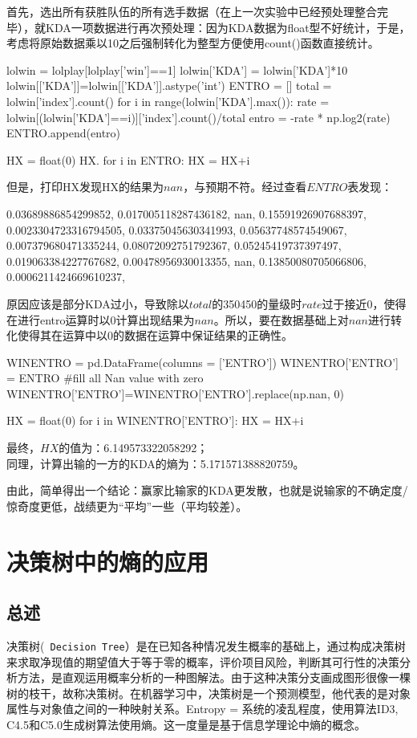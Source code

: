 \documentclass[lang=cn,11pt]{elegantpaper}
\begin{document}
首先，选出所有获胜队伍的所有选手数据（在上一次实验中已经预处理整合完毕），就KDA一项数据进行再次预处理：因为KDA数据为float型不好统计，于是，考虑将原始数据乘以10之后强制转化为整型方便使用count()函数直接统计。
\begin{python}
lolwin = lolplay[lolplay['win']==1]
lolwin['KDA'] = lolwin['KDA']*10
lolwin[['KDA']]=lolwin[['KDA']].astype('int')
ENTRO = []
total = lolwin['index'].count()
for i in range(lolwin['KDA'].max()):
    rate = lolwin[(lolwin['KDA']==i)]['index'].count()/total
    entro = -rate * np.log2(rate)
    ENTRO.append(entro)

HX = float(0)
HX.
for i in ENTRO:
    HX = HX+i
\end{python}

但是，打印HX发现HX的结果为$nan$，与预期不符。经过查看$ENTRO$表发现：
\begin{python}
 0.03689886854299852,
 0.017005118287436182,
 nan,
 0.15591926907688397,
 0.0023304723316794505,
 0.03375045630341993,
 0.05637748574549067,
 0.007379680471335244,
 0.08072092751792367,
 0.05245419737397497,
 0.019063384227767682,
 0.00478956930013355,
 nan,
 0.13850080705066806,
 0.0006211424669610237,
\end{python}

原因应该是部分KDA过小，导致除以$total$的350450的量级时$rate$过于接近0，使得在进行entro运算时以0计算出现结果为$nan$。所以，要在数据基础上对$nan$进行转化使得其在运算中以0的数据在运算中保证结果的正确性。
\begin{python}
WINENTRO =  pd.DataFrame(columns = ['ENTRO'])
WINENTRO['ENTRO'] = ENTRO
#fill all Nan value with zero
WINENTRO['ENTRO']=WINENTRO['ENTRO'].replace(np.nan, 0)

HX = float(0)
for i in WINENTRO['ENTRO']:
    HX = HX+i
\end{python}
最终，$HX$的值为：6.149573322058292；\\
同理，计算出输的一方的KDA的熵为：5.171571388820759。

由此，简单得出一个结论：赢家比输家的KDA更发散，也就是说输家的不确定度/惊奇度更低，战绩更为“平均”一些（平均较差）。

\section{决策树中的熵的应用}
\subsection{总述}
决策树(\lstinline{ Decision Tree}）是在已知各种情况发生概率的基础上，通过构成决策树来求取净现值的期望值大于等于零的概率，评价项目风险，判断其可行性的决策分析方法，是直观运用概率分析的一种图解法。由于这种决策分支画成图形很像一棵树的枝干，故称决策树。在机器学习中，决策树是一个预测模型，他代表的是对象属性与对象值之间的一种映射关系。Entropy = 系统的凌乱程度，使用算法ID3, C4.5和C5.0生成树算法使用熵。这一度量是基于信息学理论中熵的概念。
\end{document}
